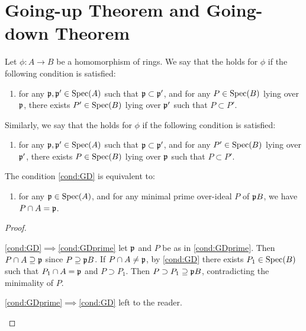 \documentclass[../main]{subfiles}
\begin{document}
\section{Going-up Theorem and Going-down Theorem}\label{sec:05}

\newparagraph Let $\phi: A \longrightarrow B$ be a homomorphism of rings. We say that the  holds for $\phi$ if the following condition is satisfied:

\begin{enumerate}[label=(GU),ref=(GU)]
    \item\label{cond:GU} for any $\mathfrak{p}, \mathfrak{p}' \in \operatorname{Spec}(A)$ such that $\mathfrak{p} \subset \mathfrak{p}'$, and for any $P\in \operatorname{Spec}(B)$ lying over $\mathfrak{p}$, there exists $P' \in \operatorname{Spec}(B)$ lying over $\mathfrak{p}'$ such that $P \subset P'$.
\end{enumerate}

Similarly, we say that the  holds for $\phi$ if the following condition is satisfied:

\begin{enumerate}[label=(GD),ref=(GD)]
    \item\label{cond:GD} for any $\mathfrak{p}, \mathfrak{p}' \in \operatorname{Spec}(A)$ such that $\mathfrak{p} \subset \mathfrak{p}'$, and for any $P' \in \operatorname{Spec}(B)$ lying over $\mathfrak{p}'$, there exists $P \in \operatorname{Spec}(B)$ lying over $\mathfrak{p}$ such that $P \subset P'$.
\end{enumerate}

\newparagraph The condition \ref{cond:GD} is equivalent to:

\begin{enumerate}[label=(GD'),ref=(GD')]
    \item\label{cond:GDprime} for any $\mathfrak{p} \in \operatorname{Spec}(A)$, and for any minimal prime over-ideal $P$ of $\mathfrak{p}B$, we have $P \cap A = \mathfrak{p}$.
\end{enumerate}

\begin{proof}\phantom{,}
\begin{implyenumerate}
    \item[\ref{cond:GD}$\implies$\ref{cond:GDprime}] let $\mathfrak{p}$ and $P$ be as in \ref{cond:GDprime}. Then $P \cap A \supseteq \mathfrak{p}$ since $P \supseteq \mathfrak{p}B$. If $P \cap A \neq \mathfrak{p}$, by \ref{cond:GD} there exists $P_1 \in \operatorname{Spec}(B)$ such that $P_1 \cap A=\mathfrak{p}$ and $P \supset P_1$. Then $P \supset P_1 \supseteq \mathfrak{p}B$, contradicting the minimality of $P$.
    \item[\ref{cond:GDprime}$\implies$\ref{cond:GD}] left to the reader.
\end{implyenumerate}
\end{proof}
\end{document}
